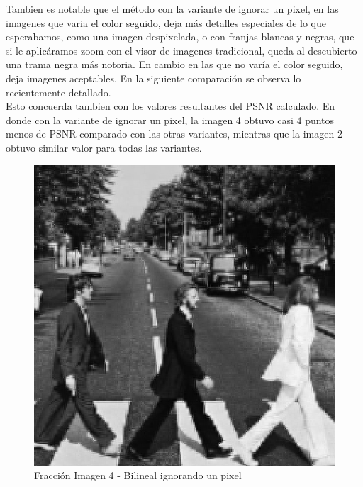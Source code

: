 \documentclass[a4paper]{article}
\newcounter{col}
\begin{document}
Tambien es notable que el m\'etodo con la variante de ignorar un pixel, en las imagenes que varia el color seguido, deja m\'as detalles especiales de lo que esperabamos, como una imagen despixelada, o con franjas blancas y negras, que si le aplic\'aramos zoom con el visor de imagenes tradicional, queda al descubierto una trama negra m\'as notoria. En cambio en las que no var\'ia el color seguido, deja imagenes aceptables. En la siguiente comparaci\'on se observa lo recientemente detallado.\\ Esto concuerda tambien con los valores resultantes del PSNR calculado. En donde con la variante de ignorar un pixel, la imagen 4 obtuvo casi 4 puntos menos de PSNR comparado con las otras variantes, mientras que la imagen 2 obtuvo similar valor para todas las variantes.\\
 \begin{figure}[H]
    \centering
    \includegraphics[scale=0.5]{imagenes/imagen4informe2.png}
    \caption{Fracci\'on Imagen 4 - Bilineal ignorando un pixel}
    \end{figure}
\end{document}
